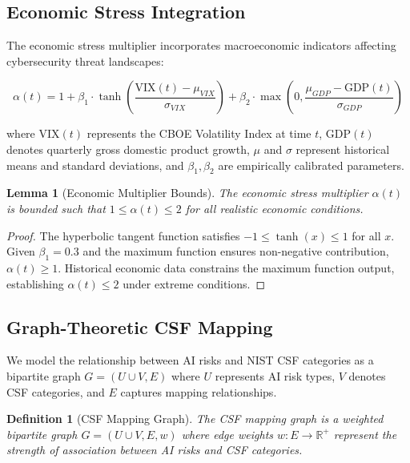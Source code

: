 \documentclass[11pt,letterpaper]{article}
\newtheorem{lemma}{Lemma}
\newtheorem{definition}{Definition}
\begin{document}
\subsection{Economic Stress Integration}

The economic stress multiplier incorporates macroeconomic indicators affecting cybersecurity threat landscapes:

\begin{equation}
\alpha(t) = 1 + \beta_1 \cdot \tanh\left(\frac{\text{VIX}(t) - \mu_{VIX}}{\sigma_{VIX}}\right) + \beta_2 \cdot \max\left(0, \frac{\mu_{GDP} - \text{GDP}(t)}{\sigma_{GDP}}\right)
\end{equation}

where $\text{VIX}(t)$ represents the CBOE Volatility Index at time $t$, $\text{GDP}(t)$ denotes quarterly gross domestic product growth, $\mu$ and $\sigma$ represent historical means and standard deviations, and $\beta_1, \beta_2$ are empirically calibrated parameters.

\begin{lemma}[Economic Multiplier Bounds]
The economic stress multiplier $\alpha(t)$ is bounded such that $1 \leq \alpha(t) \leq 2$ for all realistic economic conditions.
\end{lemma}

\begin{proof}
The hyperbolic tangent function satisfies $-1 \leq \tanh(x) \leq 1$ for all $x$. Given $\beta_1 = 0.3$ and the maximum function ensures non-negative contribution, $\alpha(t) \geq 1$. Historical economic data constrains the maximum function output, establishing $\alpha(t) \leq 2$ under extreme conditions.
\end{proof}

\subsection{Graph-Theoretic CSF Mapping}

We model the relationship between AI risks and NIST CSF categories as a bipartite graph $G = (U \cup V, E)$ where $U$ represents AI risk types, $V$ denotes CSF categories, and $E$ captures mapping relationships.

\begin{definition}[CSF Mapping Graph]
The CSF mapping graph is a weighted bipartite graph $G = (U \cup V, E, w)$ where edge weights $w: E \rightarrow \mathbb{R}^+$ represent the strength of association between AI risks and CSF categories.
\end{definition}
\end{document}
